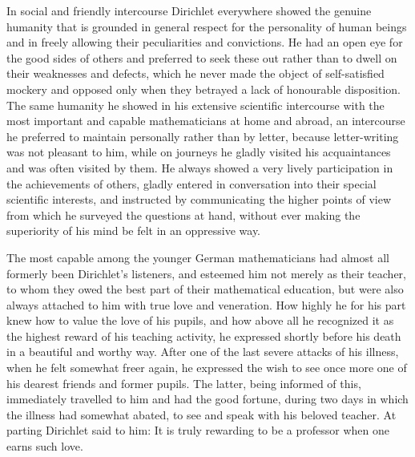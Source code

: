 \documentclass[11pt]{article}
\begin{document}
In social and friendly intercourse Dirichlet everywhere showed the genuine humanity that is grounded in general respect for the personality of human beings and in freely allowing their peculiarities and convictions. He had an open eye for the good sides of others and preferred to seek these out rather than to dwell on their weaknesses and defects, which he never made the object of self-satisfied mockery and opposed only when they betrayed a lack of honourable disposition. The same humanity he showed in his extensive scientific intercourse with the most important and capable mathematicians at home and abroad, an intercourse he preferred to maintain personally rather than by letter, because letter-writing was not pleasant to him, while on journeys he gladly visited his acquaintances and was often visited by them. He always showed a very lively participation in the achievements of others, gladly entered in conversation into their special scientific interests, and instructed by communicating the higher points of view from which he surveyed the questions at hand, without ever making the superiority of his mind be felt in an oppressive way.

The most capable among the younger German mathematicians had almost all formerly been Dirichlet's listeners, and esteemed him not merely as their teacher, to whom they owed the best part of their mathematical education, but were also always attached to him with true love and veneration. How highly he for his part knew how to value the love of his pupils, and how above all he recognized it as the highest reward of his teaching activity, he expressed shortly before his death in a beautiful and worthy way. After one of the last severe attacks of his illness, when he felt somewhat freer again, he expressed the wish to see once more one of his dearest friends and former pupils. The latter, being informed of this, immediately travelled to him and had the good fortune, during two days in which the illness had somewhat abated, to see and speak with his beloved teacher. At parting Dirichlet said to him: It is truly rewarding to be a professor when one earns such love.
\end{document}
